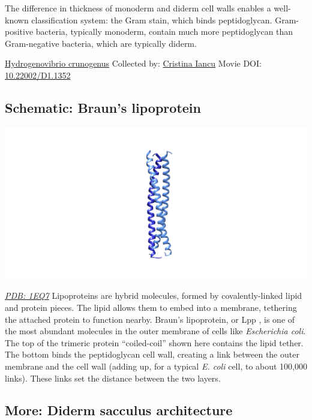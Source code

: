 \documentclass[]{tufte-book}
\begin{document}
The difference in thickness of monoderm and diderm cell walls enables a well-known classification system: the Gram stain, which binds peptidoglycan. Gram-positive bacteria, typically monoderm, contain much more peptidoglycan than Gram-negative bacteria, which are typically diderm.



\hypertarget{htmlwidget-8e25ed9f5655583f8d73}{}

\label{fig:2-3}\protect\hyperlink{tree}{Hydrogenovibrio crunogenus} Collected by: \protect\hyperlink{cristina_iancu}{Cristina Iancu} Movie DOI: \href{https://doi.org/10.22002/D1.1352}{10.22002/D1.1352}

\hypertarget{Brauns_lipoprotein}{%
\subsection*{Schematic: Braun's lipoprotein}\label{Brauns_lipoprotein}}

\includegraphics{img/schematics/2_3_1}

\href{http://rcsb.org/structure/1EQ7}{\emph{PDB: 1EQ7}}
Lipoproteins are hybrid molecules, formed by covalently-linked lipid and protein pieces. The lipid allows them to embed into a membrane, tethering the attached protein to function nearby. Braun's lipoprotein, or Lpp \citep{shu2000}, is one of the most abundant molecules in the outer membrane of cells like \emph{Escherichia coli}. The top of the trimeric protein ``coiled-coil'' shown here contains the lipid tether. The bottom binds the peptidoglycan cell wall, creating a link between the outer membrane and the cell wall (adding up, for a typical \emph{E. coli} cell, to about 100,000 links). These links set the distance between the two layers.

\hypertarget{Diderm_sacculus_architecture}{%
\subsection*{More: Diderm sacculus architecture}\label{Diderm_sacculus_architecture}}
\end{document}
